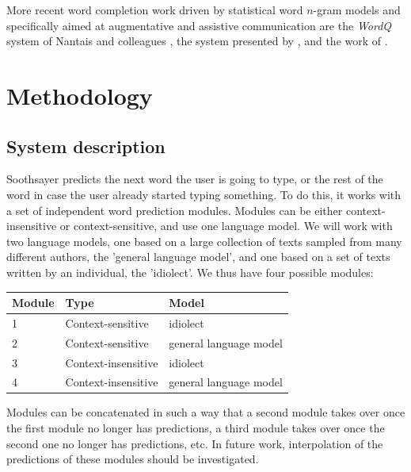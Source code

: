 \documentclass[12pt]{article}
\let\originaltable\table
\let\endoriginaltable\endtable
\renewenvironment{table}[1][ht]{%
  \originaltable[#1]
  \centering}%
  {\endoriginaltable}
\begin{document}
More recent word completion work driven by statistical word $n$-gram models and specifically aimed at augmentative and assistive communication are the {\it WordQ}\/ system of Nantais and colleagues \cite{Nantais+01,Shein+01}, the system presented by , and the work of .

\section{Methodology}

\subsection{System description} \label{algorithm}

Soothsayer predicts the next word the user is going to type, or the rest of the word in case the user already started typing something. To do this, it works with a set of independent word prediction modules. Modules can be either context-insensitive or context-sensitive, and use one language model. We will work with two language models, one based on a large collection of texts sampled from many different authors, the 'general language model', and one based on a set of texts written by an individual, the 'idiolect'. We thus have four possible modules:

\begin{table}[htb]
\begin{tabular}{lll} 
Module&Type&Model\\
\hline
1& {\footnotesize Context-sensitive} & {\footnotesize idiolect}\\
2& {\footnotesize Context-sensitive} & {\footnotesize general language model} \\
3& {\footnotesize Context-insensitive} & {\footnotesize idiolect}\\ 
4& {\footnotesize Context-insensitive} & {\footnotesize general language model} \\
\end{tabular} 
\caption{Four possible modules: combinations of type and language model}
\end{table}

Modules can be concatenated in such a way that a second module takes over once the first module no longer has predictions, a third module takes over once the second one no longer has predictions, etc. In future work, interpolation of the predictions of these modules should be investigated.
\end{document}
